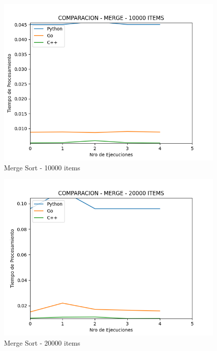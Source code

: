 \documentclass[12pt]{article} %
\begin{document}
    \begin{figure}[H]
    \centering
    \includegraphics[width=\textwidth]{merge_10000}
    \caption{Merge Sort - 10000 items}
    \end{figure}

    \vspace{5mm}
    
    \begin{figure}[H]
    \centering
    \includegraphics[width=\textwidth]{merge_20000}
    \caption{Merge Sort - 20000 items}
    \end{figure}

    \vspace{5mm}
    
\end{document}
